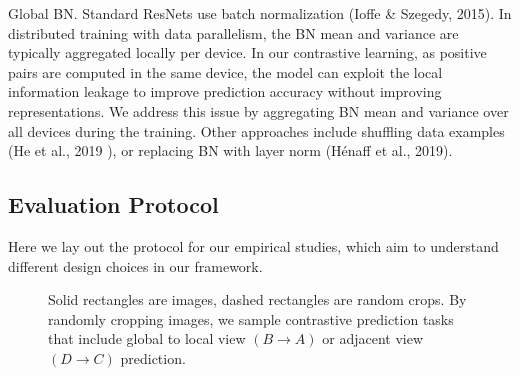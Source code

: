 \documentclass[]{IEEEtran}
\begin{document}
Global BN. Standard ResNets use batch normalization (Ioffe \& Szegedy, 2015). In distributed training with data parallelism, the BN mean and variance are typically aggregated locally per device. In our contrastive learning, as positive pairs are computed in the same device, the model can exploit the local information leakage to improve prediction accuracy without improving representations. We address this issue by aggregating BN mean and variance over all devices during the training. Other approaches include shuffling data examples (He et al., 2019 ), or replacing BN with layer norm (Hénaff et al., 2019).

\subsection{Evaluation Protocol}

Here we lay out the protocol for our empirical studies, which aim to understand different design choices in our framework.

\begin{figure}[!ht]
  \centering
  \hspace{1mm}
  \hspace{1mm}
  \break
  \caption{Solid rectangles are images, dashed rectangles are random crops. By randomly cropping images, we sample contrastive prediction tasks that include global to local view $(B \rightarrow A)$ or adjacent view $(D \rightarrow C)$ prediction. }
  \label{fig3}
\end{figure}
\end{document}
